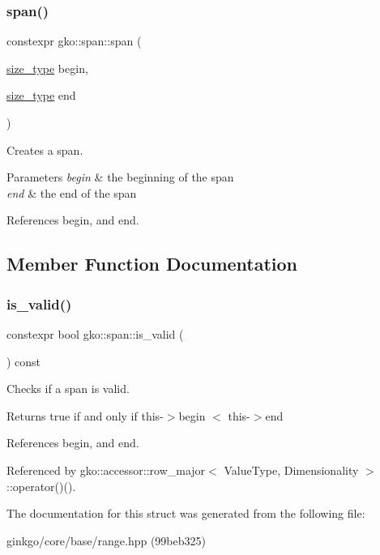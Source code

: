 \subsubsection{\texorpdfstring{span()}{span()}\hspace{0.1cm}{\footnotesize\ttfamily [2/2]}}
{\footnotesize\ttfamily constexpr gko\+::span\+::span (\begin{DoxyParamCaption}\item[{\hyperlink{namespacegko_a6e5c95df0ae4e47aab2f604a22d98ee7}{size\+\_\+type}}]{begin,  }\item[{\hyperlink{namespacegko_a6e5c95df0ae4e47aab2f604a22d98ee7}{size\+\_\+type}}]{end }\end{DoxyParamCaption})\hspace{0.3cm}{\ttfamily [noexcept]}}



Creates a span. 


\begin{DoxyParams}{Parameters}
{\em begin} & the beginning of the span \\
\hline
{\em end} & the end of the span \\
\hline
\end{DoxyParams}


References begin, and end.



\subsection{Member Function Documentation}
\mbox{\label{structgko_1_1span_a32a87f434708e6857820858503f9b133}} 
\subsubsection{\texorpdfstring{is\+\_\+valid()}{is\_valid()}}
{\footnotesize\ttfamily constexpr bool gko\+::span\+::is\+\_\+valid (\begin{DoxyParamCaption}{ }\end{DoxyParamCaption}) const}



Checks if a span is valid. 

\begin{DoxyReturn}{Returns}
true if and only if {\ttfamily this-\/$>$begin $<$ this-\/$>$end} 
\end{DoxyReturn}


References begin, and end.



Referenced by gko\+::accessor\+::row\+\_\+major$<$ Value\+Type, Dimensionality $>$\+::operator()().



The documentation for this struct was generated from the following file\+:\begin{DoxyCompactItemize}
\item 
ginkgo/core/base/range.\+hpp (99beb325)\end{DoxyCompactItemize}
